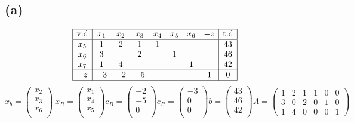 \documentclass{article}
\begin{document}
\subsection*{(a)} 
\begin{center}
   \begin{equation*}
      \begin{array}{|c|ccccccc|c|}
         \hline
         \text{v.d} & x_1 & x_2 & x_3 & x_4 & x_5 & x_6 & -z & \text{t.d} \\ \hline
         x_5        &  1  &  2  &  1  &  1  &     &     &    & 43  \\ 
         x_6        &  3  &     &  2  &     &  1  &     &    & 46 \\ 
         x_7        &  1  &  4  &     &     &     &  1  &    & 42 \\ \hline 
         -z         & -3  & -2  & -5  &     &     &     &  1 & 0 \\ \hline
      \end{array}
   \end{equation*}
   \vspace{5mm} %
   $x_b=
   \begin{pmatrix}
     x_2\\
     x_3\\
     x_6\\
   \end{pmatrix}
   \:
   x_R =
   \begin{pmatrix}
     x_1\\
     x_4\\
     x_5\\
   \end{pmatrix}
   c_B =
   \begin{pmatrix}
     -2\\
     -5\\
     0\\
   \end{pmatrix}
   c_R =
   \begin{pmatrix}
     -3\\
     0\\
     0\\
   \end{pmatrix}
   b =
   \begin{pmatrix}
     43\\
     46\\
     42\\
   \end{pmatrix}
   A =
   \begin{pmatrix}
     1  &  2  &  1  &  1  &  0  &   0  \\
     3  &  0  &  2  &  0  &  1  &   0  \\  
     1  &  4  &  0  &  0  &  0  &  1  
   \end{pmatrix}$


\end{center}
\end{document}
